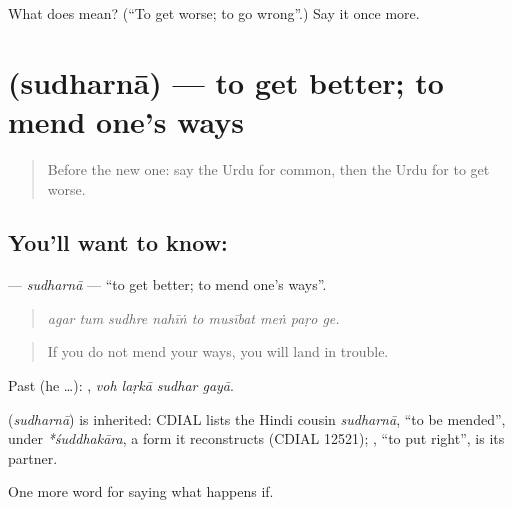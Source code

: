 \begin{tcolorbox}[breakable,colback=teal!4,colframe=teal!35!black,title={Before you move on}]
What does  mean? (\textquotedblleft{}To get worse; to go wrong\textquotedblright{}.) Say it once more.
\end{tcolorbox}
\section[\texorpdfstring{\ur{سدھرنا} (sudharnā)}{سدھرنا (sudharnā)}]{ (sudharnā) — to get better; to mend one's ways}

\label{lesson:UR-C377-sudharna-improve}



\begin{quote}
Before the new one: say the Urdu for common, then the Urdu for to get worse.
\end{quote}

\subsection*{You'll want to know: }
\textbf{} — \emph{sudharnā} — \textquotedblleft{}to get better; to mend one's ways\textquotedblright{}.

\begin{quote}
        
\end{quote}

\begin{quote}
\emph{agar tum sudhre nahīṅ to musībat meṅ paṛo ge.}
\end{quote}

\begin{quote}
If you do not mend your ways, you will land in trouble.
\end{quote}

Past (he …):    , \emph{voh laṛkā sudhar gayā}.

\begin{cousinweb}
\textbf{} (\emph{sudharnā}) is inherited: CDIAL lists the Hindi cousin \emph{sudharnā}, \textquotedblleft{}to be mended\textquotedblright{}, under \emph{*śuddhakāra}, a form it reconstructs (CDIAL 12521); \textbf{}, \textquotedblleft{}to put right\textquotedblright{}, is its partner.
\end{cousinweb}

\begin{grammarlens}[title={What you've built}]
One more word for saying what happens if.
\end{grammarlens}

